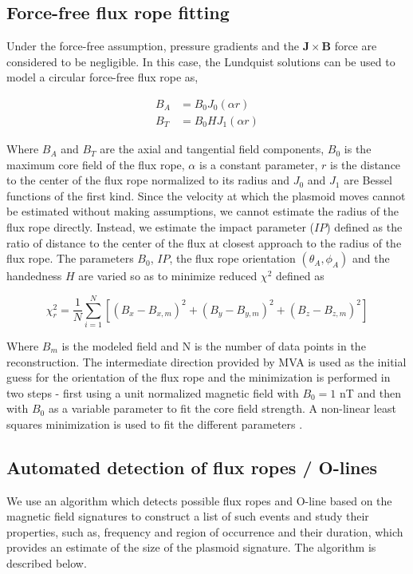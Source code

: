 \subsection{Force-free flux rope fitting}
Under the force-free assumption, pressure gradients and the $\mathbf{J}\times\mathbf{B}$ force are considered to be negligible. In this case, the Lundquist solutions can be used to model a circular force-free flux rope \cite{Lepping1990MagneticAU,Slavin2003GeotailSheet} as, 

\begin{align}
    B_A & = B_0 J_0 \left( \alpha r \right)\\
    B_T & = B_0 H J_1 \left( \alpha r \right)
\end{align}

Where $B_A$ and $B_T$ are the axial and tangential field components, $B_0$ is the maximum core field of the flux rope, $\alpha$ is a constant parameter, $r$ is the distance to the center of the flux rope normalized to its radius and $J_0$ and $J_1$ are Bessel functions of the first kind. Since the velocity at which the plasmoid moves cannot be estimated without making assumptions, we cannot estimate the radius of the flux rope directly. Instead, we estimate the impact parameter ($IP$) defined as the ratio of distance to the center of the flux at closest approach to the radius of the flux rope. The parameters $B_0$, $IP$, the flux rope orientation $(\theta_A, \phi_A)$ and the handedness $H$ are varied so as to minimize reduced $\chi^2$ defined as \cite{Lepping1990MagneticAU}

\begin{equation}
    \chi_r^2 = \frac{1}{N} \sum_{i=1}^{N} \left[ \left(B_x - B_{x,m} \right)^2 + \left(B_y - B_{y,m} \right)^2 + \left(B_z - B_{z,m} \right)^2 \right]
\end{equation}

Where $B_m$ is the modeled field and N is the number of data points in the reconstruction. The intermediate direction provided by MVA is used as the initial guess for the orientation of the flux rope  and the minimization is performed in two steps - first using a unit normalized magnetic field with $B_0=1$ nT and then with $B_0$ as a variable parameter to fit the core field strength. A non-linear least squares minimization is used to fit the different parameters \cite{Newville2018Non-LinearPython}. 

\subsection{Automated detection of flux ropes / O-lines}
We use an algorithm which detects possible flux ropes and O-line based on the magnetic field signatures to construct a list of such events and study their properties, such as, frequency and region of occurrence and their duration, which provides an estimate of the size of the plasmoid signature. The algorithm is described below. 

